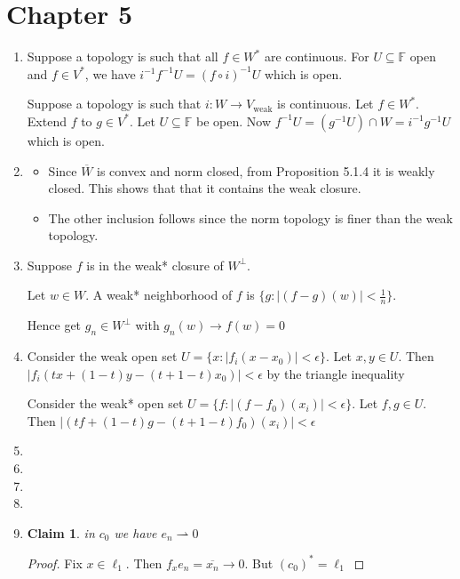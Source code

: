 \documentclass{article}
\newtheorem*{claim}{Claim}
\begin{document}
\section*{Chapter 5}
\begin{enumerate}
    \item Suppose a topology is such that all $f \in W^*$ are continuous. For $U \subseteq \mathbb{F}$ open and $f \in V^*$, we have $i^{-1}f^{-1}U=(f \circ i)^{-1}U$ which is open.

    Suppose a topology is such that $i:W \to V_{\text{weak}}$ is continuous. Let $f \in W^*$. Extend $f$ to $g \in V^*$. Let $U \subseteq \mathbb{F}$ be open. Now $f^{-1}U=(g^{-1}U) \cap W=i^{-1}g^{-1}U$ which is open.

    \item \begin{itemize}
        \item Since $\overline{W}$ is convex and norm closed, from Proposition 5.1.4 it is weakly closed. This shows that that it contains the weak closure.

        \item The other inclusion follows since the norm topology is finer than the weak topology.
    \end{itemize}
    
    \item Suppose $f$ is in the weak* closure of $W^\perp$. 
    
    Let $w\in W$. A weak* neighborhood of $f$ is $\{g:|(f-g)(w)|<\frac{1}{n}\}$. 
    
    Hence get $g_n \in W^\perp$ with $g_n(w) \to f(w)=0$

    \item Consider the weak open set $U=\{x:|f_i(x-x_0)|<\epsilon\}$. Let $x,y \in U$. Then $|f_i(tx+(1-t)y-(t+1-t)x_0)| < \epsilon$ by the triangle inequality

    Consider the weak* open set $U=\{f:|(f-f_0)(x_i)|<\epsilon\}$. Let $f,g \in U$. Then $|(tf+(1-t)g-(t+1-t)f_0)(x_i)|<\epsilon$

    \item 
    \item 
    \item 
    \item 
    \item \begin{claim}
        in $c_0$ we have $e_n\rightharpoonup0$
    \end{claim}

    \begin{proof}
        Fix $x \in \ell_1$. Then $f_xe_n=\overline{x_n} \to 0$. But $(c_0)^*=\ell_1$
    \end{proof}


\end{enumerate}
\end{document}
